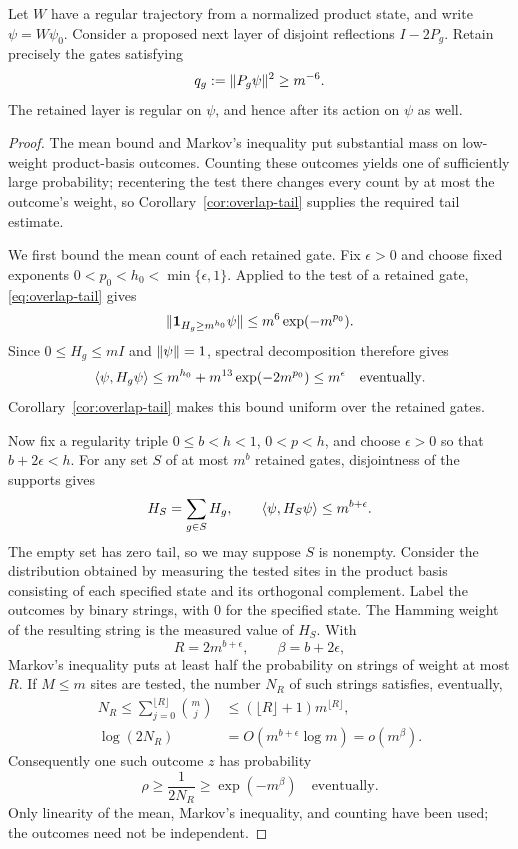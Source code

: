 \newpage
\begin{lemma}\label{lem:retained-layer}
Let $W$ have a regular trajectory from a normalized product state, and
write $\psi=W\psi_0$.  Consider a proposed next layer of disjoint
reflections $I-2P_g$.  Retain precisely the gates satisfying
\begin{equation}\label{eq:retention-rule}
 q_g:=\lVert P_g\psi\rVert^{2}\ge m^{-6}.
\end{equation}
The retained layer is regular on $\psi$, and hence after its action on
$\psi$ as well.
\end{lemma}

\begin{proof}
The mean bound and Markov's inequality put substantial mass on
low-weight product-basis outcomes. Counting these outcomes yields
one of sufficiently large probability; recentering the test there
changes every count by at most the outcome's weight, so
Corollary~\ref{cor:overlap-tail} supplies the required tail estimate.

We first bound the mean count of each retained gate.  Fix $\epsilon>0$
and choose fixed exponents $0<p_0<h_0<\min\{\epsilon,1\}$.  Applied to
the test of a retained gate, \eqref{eq:overlap-tail} gives
\[
 \lVert\mathbf 1_{H_g\ge m^{h_0}}\psi\rVert
 \le m^6\exp(-m^{p_0}).
\]
Since $0\le H_g\le mI$ and $\lVert\psi\rVert=1$, spectral decomposition
therefore gives
\begin{equation}\label{eq:retained-mean}
 \langle \psi,H_g\psi\rangle
 \le m^{h_0}+m^{13}\exp(-2m^{p_0})
 \le m^{\epsilon}
 \quad\text{eventually}.
\end{equation}
Corollary~\ref{cor:overlap-tail} makes this bound uniform over the
retained gates.

Now fix a regularity triple $0\le b<h<1$, $0<p<h$, and choose
$\epsilon>0$ so that $b+2\epsilon<h$.  For any set $S$ of at most
$m^b$ retained gates, disjointness of the supports gives
\[
 H_S=\sum_{g\in S}H_g,
 \qquad
 \langle \psi,H_S\psi\rangle\le m^{b+\epsilon}.
\]
The empty set has zero tail, so we may suppose $S$ is nonempty.
Consider the distribution obtained by measuring the tested sites in
the product basis consisting of each specified state and its
orthogonal complement.  Label the outcomes by
binary strings, with $0$ for the specified state.  The Hamming weight
of the resulting string is the measured value of $H_S$.  With
\[
 R=2m^{b+\epsilon},\qquad \beta=b+2\epsilon,
\]
Markov's inequality puts at least half the probability on strings of
weight at most $R$.  If $M\le m$ sites are tested, the number $N_R$ of
such strings satisfies, eventually,
\begin{align*}
 N_R\le\sum_{j=0}^{\lfloor R\rfloor}\binom mj
 &\le (\lfloor R\rfloor+1)m^{\lfloor R\rfloor},\\
 \log(2N_R)&=O(m^{b+\epsilon}\log m)=o(m^{\beta}).
\end{align*}
Consequently one such outcome $z$ has probability
\begin{equation}\label{eq:pruning-atom}
 \rho\ge\frac{1}{2N_R}\ge\exp(-m^{\beta})
 \quad\text{eventually}.
\end{equation}
Only linearity of the mean, Markov's inequality, and counting have
been used; the outcomes need not be independent.


\end{proof}
